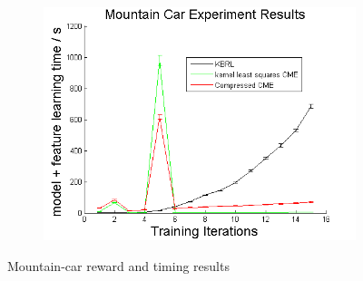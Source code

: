 \documentclass[letterpaper]{article}
\begin{document}
\begin{figure}[htb]
\begin{subfigure}[b]{0.3\textwidth}
\includegraphics[width=\textwidth]{MCmodelfeature.png}
\end{subfigure}
\caption{Mountain-car reward and timing results}
  \label{MCfigs}
\end{figure}
\end{document}
